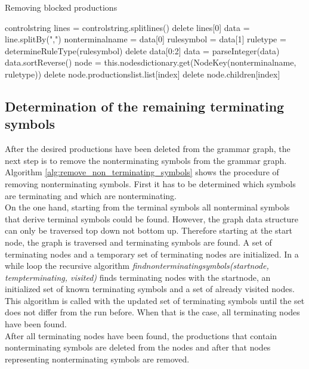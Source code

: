 \begin{algorithm}[H]
\caption{Removing blocked productions}
\begin{algorithmic}[1] 
\Require control\textunderscore string
\State lines = control\textunderscore string.splitlines()
\State delete lines[0]
	\State data = line.splitBy(",")
	\State nonterminal\textunderscore name = data[0] 
	\State rule\textunderscore symbol = data[1]
	\State rule\textunderscore type = determineRuleType(rule\textunderscore symbol)
	\State delete data[0:2]
	\State data = parseInteger(data)
	\State data.sortReverse()
	\State node = this.nodes\textunderscore dictionary.get(Node\textunderscore Key(nonterminal\textunderscore name, rule\textunderscore type))
		\State delete node.productions\textunderscore list.list[index]
		\State delete node.children[index]
	\EndFor
\EndFor
\end{algorithmic}
\label{alg:remove_blocked_productions}
\end{algorithm}

\subsection{Determination of the remaining terminating symbols}

After the desired productions have been deleted from the grammar graph, the next step is to remove the nonterminating symbols from the grammar graph. Algorithm \ref{alg:remove_non_terminating_symbols} shows the procedure of removing nonterminating symbols.
First it has to be determined which symbols are terminating and which are nonterminating. \\
On the one hand, starting from the terminal symbols all nonterminal symbols that derive terminal symbols could be found. However, the graph data structure can only be traversed top down not bottom up.
Therefore starting at the start node, the graph is traversed and terminating symbols are found. 
A set of terminating nodes and a temporary set of terminating nodes are initialized.
In a while loop the recursive algorithm \textit{find\textunderscore non\textunderscore terminating\textunderscore symbols(start\textunderscore node, temp\textunderscore terminating, visited)} finds terminating nodes with the start\textunderscore node, an initialized set of known terminating symbols and a set of already visited nodes.
This algorithm is called with the updated set of terminating symbols until the set does not differ from the run before.
When that is the case, all terminating nodes have been found.\\
After all terminating nodes have been found, the productions that contain nonterminating symbols are deleted from the nodes and after that nodes representing nonterminating symbols are removed.

